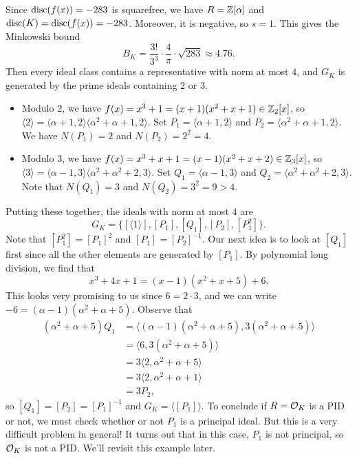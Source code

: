 Since $\operatorname{disc}(f(x)) = -283$ is squarefree, we have $R = \mathbb{Z}[\alpha]$ 
and $\operatorname{disc}(K) = \operatorname{disc}(f(x)) = -283$. 
Moreover, it is negative, so $s = 1$. This gives the Minkowski bound 
\[ B_K = \frac{3!}{3^3} \cdot \frac{4}{\pi} \cdot \sqrt{283} \approx 4.76. \] 
Then every ideal class contains a representative with norm at most $4$, 
and $G_K$ is generated by the prime ideals containing $2$ or $3$. 
\begin{itemize}
    \item Modulo $2$, we have $f(x) = x^3 + 1 = (x+1)(x^2+x+1) \in \mathbb{Z}_2[x]$, so $\langle 2 \rangle 
    = \langle \alpha+1, 2 \rangle \langle \alpha^2 + \alpha + 1, 2 \rangle$. 
    Set $P_1 = \langle \alpha+1, 2 \rangle$ and $P_2 = \langle \alpha^2 + 
    \alpha + 1, 2 \rangle$. We have $N(P_1) = 2$ and $N(P_2) = 2^2 = 4$. 
    \item Modulo $3$, we have $f(x) = x^3 + x + 1 = (x-1)(x^2 + x + 2) \in \mathbb{Z}_3[x]$, 
    so $\langle 3 \rangle = \langle \alpha-1, 3 \rangle \langle \alpha^2 + \alpha^2 
    +2, 3 \rangle$. Set $Q_1 = \langle \alpha-1, 3 \rangle$ and 
    $Q_2 = \langle \alpha^2 + \alpha^2 +2, 3 \rangle$. Note that 
    $N(Q_1) = 3$ and $N(Q_2) = 3^2 = 9 > 4$. 
\end{itemize}
Putting these together, the ideals with norm at most $4$ are 
\[ G_K = \{[\langle 1 \rangle], [P_1], [Q_1], [P_2], [P_1^2]\}. \] 
Note that $[P_1^2] = [P_1]^2$ and $[P_1] = [P_2]^{-1}$. Our next idea is to 
look at $[Q_1]$ first since all the other elements are generated by $[P_1]$.
By polynomial long division, we find that 
\[ x^3 + 4x + 1 = (x - 1)(x^2 + x + 5) + 6. \] 
This looks very promising to us since $6 = 2 \cdot 3$, and 
we can write $-6 = (\alpha-1)(\alpha^2 + \alpha + 5)$. Observe that 
\begin{align*}
    (\alpha^2 + \alpha + 5)Q_1 &= \langle (\alpha-1)(\alpha^2 + \alpha + 5), 
    3(\alpha^2 + \alpha + 5) \rangle \\ 
    &= \langle 6, 3(\alpha^2 + \alpha + 5) \rangle \\ 
    &= 3 \langle 2, \alpha^2 + \alpha + 5 \rangle \\ 
    &= 3 \langle 2, \alpha^2 + \alpha + 1 \rangle \\ 
    &= 3P_2,
\end{align*}
so $[Q_1] = [P_2] = [P_1]^{-1}$ and $G_K = \langle [P_1] \rangle$. 
To conclude if $R = {\cal O}_K$ is a PID or not, we must check whether 
or not $P_1$ is a principal ideal. But this is a very difficult problem in general! 
It turns out that in this case, $P_1$ is not principal, so ${\cal O}_K$ is 
not a PID. We'll revisit this example later. 

